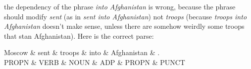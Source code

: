 \begin{parts}
the dependency of the phrase \emph{into Afghanistan} is wrong, because the phrase should modify \emph{sent} (as in \textit{sent into Afghanistan}) not \emph{troops} (because \textit{troops into Afghanistan} doesn't make sense, unless there are somehow weirdly some troops that stan Afghanistan). Here is the correct parse:

\begin{center}
 {
 \begin{dependency}
 \begin{deptext}
Moscow  \& sent \& troops \& into  \& Afghanistan \& .     \\
 PROPN \& VERB  \& NOUN  \& ADP \& PROPN \& PUNCT \\
 \end{deptext}
 \end{dependency}
 }
 \end{center}


\end{parts}
